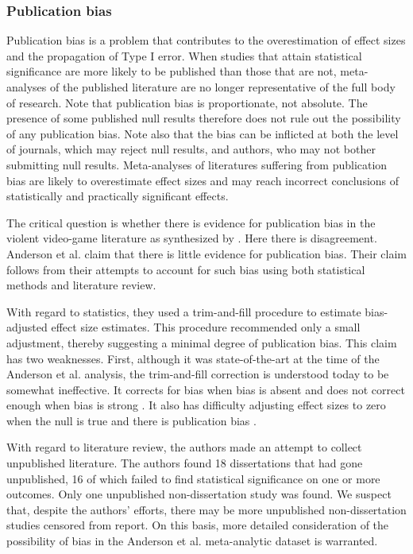 \documentclass[man, mask]{apa6}
\begin{document}
\subsubsection{Publication bias}
Publication bias is a problem that contributes to the overestimation of effect sizes and the propagation of Type I error. When studies that attain statistical significance are more likely to be published than those that are not, meta-analyses of the published literature are no longer representative of the full body of research. Note that publication bias is proportionate, not absolute. The presence of some published null results therefore does not rule out the possibility of any publication bias. Note also that the bias can be inflicted at both the level of journals, which may reject null results, and authors, who may not bother submitting null results.
Meta-analyses of literatures suffering from publication bias are likely to overestimate effect sizes and may reach incorrect conclusions of statistically and practically significant effects.

The critical question is whether there is evidence for publication bias in the violent video-game literature as synthesized by \citet{Anderson:etal:2010}.  Here there is disagreement.  Anderson et al. claim that there is little evidence for publication bias.  Their claim follows from their attempts to account for such bias using both statistical methods and literature review.  

With regard to statistics, they used a trim-and-fill procedure to estimate bias-adjusted effect size estimates. This procedure recommended only a small adjustment, thereby suggesting a minimal degree of publication bias. This claim has two weaknesses. First, although it was state-of-the-art at the time of the Anderson et al. analysis, the trim-and-fill correction is understood today to be somewhat ineffective. It corrects for bias when bias is absent and does not correct enough when bias is strong \citep{Simonsohn:etal:2014b,vanAssen:etal:2015}. It also has difficulty adjusting effect sizes to zero when the null is true and there is publication bias \citep{Moreno:etal:2009,vanAssen:etal:2015}. 

With regard to literature review, the authors made an attempt to collect unpublished literature. The authors found 18 dissertations that had gone unpublished, 16 of which failed to find statistical significance on one or more outcomes. Only one unpublished non-dissertation study was found. We suspect that, despite the authors' efforts, there may be more unpublished non-dissertation studies censored from report. On this basis, more detailed consideration of the possibility of bias in the Anderson et al. meta-analytic dataset is warranted.
\end{document}

